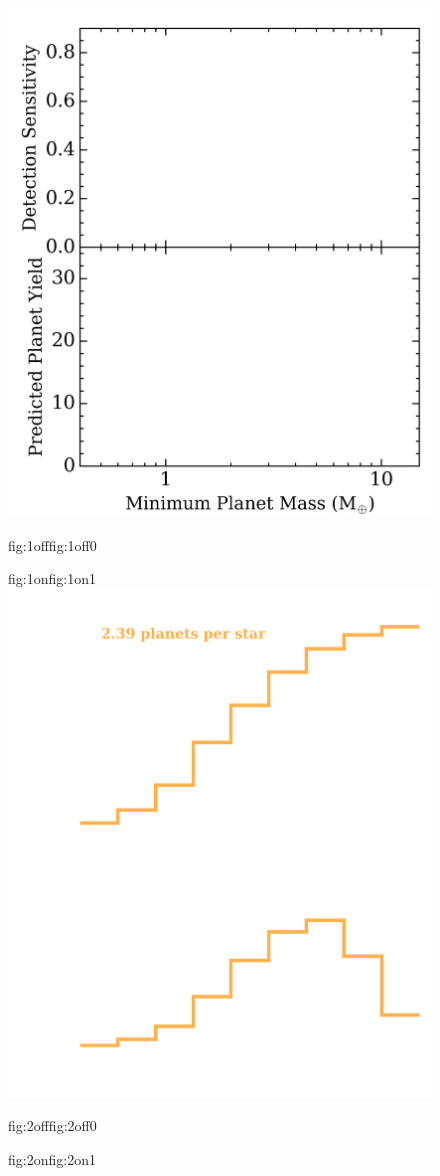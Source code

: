 \begin{figure}
  \centering
  \includegraphics[width=0.6\hsize]{figures/2occ_opt_bkgd.png}%
  \hspace{-0.6\hsize}%
  \begin{ocg}{fig:1off}{fig:1off}{0}%
  \end{ocg}%
  \begin{ocg}{fig:1on}{fig:1on}{1}%
    \includegraphics[width=0.6\hsize]{figures/2occ_opt_1.png}%
  \end{ocg}
  \hspace{-0.6\hsize}%
  \begin{ocg}{fig:2off}{fig:2off}{0}%
  \end{ocg}%
  \begin{ocg}{fig:2on}{fig:2on}{1}%

\end{ocg}
\end{figure}
